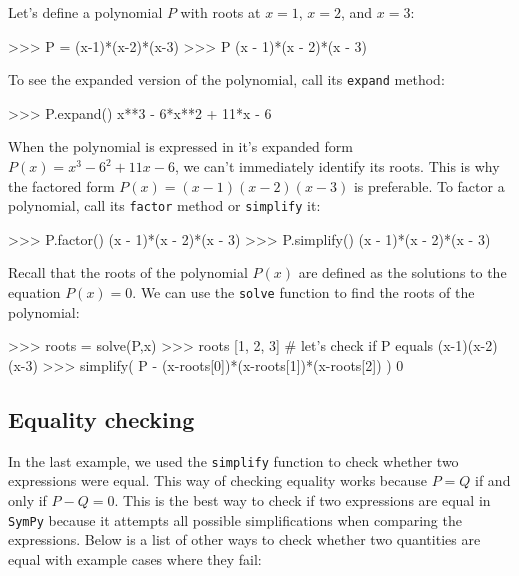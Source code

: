 Let's define a polynomial $P$ with roots at $x=1$, $x=2$, and $x=3$:



\small
\begin{verbatimtab}
>>> P = (x-1)*(x-2)*(x-3)
>>> P
(x - 1)*(x - 2)*(x - 3)
\end{verbatimtab}
\normalsize

\noindent
To see the expanded version of the polynomial, 
call its \texttt{expand} method:

\small
\begin{verbatimtab}
>>> P.expand()
x**3 - 6*x**2 + 11*x - 6
\end{verbatimtab}
\normalsize

\noindent
When the polynomial is expressed in it's expanded form $P(x)=x^3-6^2 + 11x - 6$,
we can't immediately identify its roots. 
This is why the factored form $P(x)=(x-1)(x-2)(x-3)$ is preferable.
To factor a polynomial, 
call its \texttt{factor} method or \texttt{simplify} it:

\small
\begin{verbatimtab}
>>> P.factor()
(x - 1)*(x - 2)*(x - 3)
>>> P.simplify()
(x - 1)*(x - 2)*(x - 3)
\end{verbatimtab}
\normalsize

\noindent
Recall that the roots of the polynomial $P(x)$ are defined as the solutions to the equation $P(x)=0$.
We can use the \texttt{solve} function to find the roots of the polynomial:

\small
\begin{verbatimtab}
>>> roots = solve(P,x)
>>> roots
[1, 2, 3]
# let's check if P equals (x-1)(x-2)(x-3)
>>> simplify( P  -  (x-roots[0])*(x-roots[1])*(x-roots[2]) )   
0  
\end{verbatimtab}
\normalsize


\subsection{Equality checking}
\label{basics:equality_checking}

In the last example, we used the \texttt{simplify} function to check whether two expressions were equal.
This way of checking equality works because $P=Q$ if and only if $P-Q=0$.
This is the best way to check if two expressions are equal in \texttt{SymPy}
because it attempts all possible simplifications when comparing the expressions.
Below is a list of other ways to check whether two quantities are equal
with example cases where they fail:

